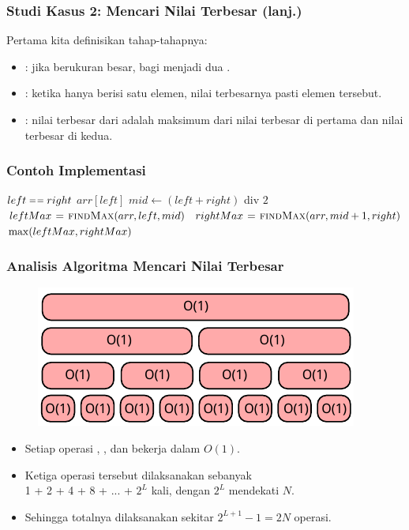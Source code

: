 \begin{frame}
\frametitle{Studi Kasus 2: Mencari Nilai Terbesar (lanj.)}
Pertama kita definisikan tahap-tahapnya:
\begin{itemize}
  \item {}: jika \farray berukuran besar, bagi menjadi dua \fsubarray.
  \item {}: ketika \farray hanya berisi satu elemen, nilai terbesarnya pasti elemen tersebut.
  \item {}: nilai terbesar dari \farray adalah maksimum dari nilai terbesar di \fsubarray pertama dan nilai terbesar di \fsubarray kedua.
\end{itemize}
\end{frame}

\begin{frame}
\frametitle{Contoh Implementasi}
\begin{codebox}
\li \If $left \isequal right$ \Then
\li   \Return $arr[left]$
\li \Else
\li   $mid \gets (left + right)$ div $2$
\li   $leftMax \mathrel{\hspace{1pt}=\hspace{1pt}} \textnormal{\scshape findMax}(arr, left, mid)$
\li   $rightMax \mathrel{\hspace{1pt}=\hspace{1pt}} \textnormal{\scshape findMax}(arr, mid+1, right)$
\li   \Return $\func{max}(leftMax, rightMax)$
    \End
\end{codebox}
\end{frame}

\begin{frame}
\frametitle{Analisis Algoritma Mencari Nilai Terbesar}
\begin{figure}
  \centering
  \includegraphics[width=8 cm]{asset/find-max-complexity.pdf}
\end{figure}
\begin{itemize}
  \item Setiap operasi , , dan  bekerja dalam $O(1)$.
  \item Ketiga operasi tersebut dilaksanakan sebanyak\\1 + 2 + 4 + 8 + ... + $2^L$ kali, dengan $2^L$ mendekati $N$.
  \item Sehingga totalnya dilaksanakan sekitar $2^{L+1} - 1 = 2N$ operasi.
\end{itemize}
\end{frame}

